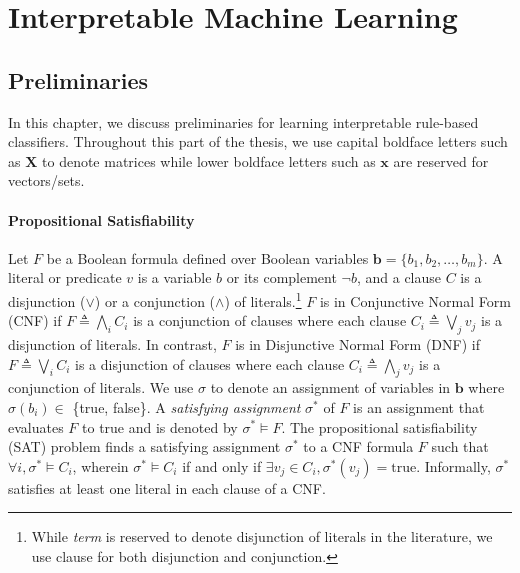 \part{Interpretable Machine Learning}

\chapter{Preliminaries}


In this chapter, we discuss preliminaries for learning interpretable rule-based classifiers. Throughout this part of the thesis, we use capital  boldface letters such as $\mathbf{X}$ to denote matrices while lower boldface letters such as $\mathbf{x}$ are reserved for vectors/sets. 

\subsection*{Propositional Satisfiability}

Let $F$ be a Boolean formula defined over Boolean variables $\mathbf{b} = \{b_1,b_2,\dots ,b_m \}$. A literal or predicate $ v $ is a variable $b$ or its complement $\neg b$, and a clause $ C $ is a disjunction ($ \vee $) or a conjunction ($ \wedge $) of literals.\footnote{While \emph{term} is reserved to denote disjunction of literals in the literature, we use clause for both disjunction and conjunction.}  $F$ is in Conjunctive Normal Form (CNF) if $F \triangleq  \bigwedge_i C_i$ is a conjunction of clauses where each clause $C_i \triangleq  \bigvee_j v_j $  is a disjunction of literals. In contrast, $ F $ is in Disjunctive Normal Form (DNF) if $F \triangleq  \bigvee_i C_i$ is a disjunction of clauses where each clause $C_i \triangleq  \bigwedge_j v_j $ is a conjunction of literals. We use $\sigma$ to denote an assignment of variables in  $\mathbf{b}$ where $ \sigma(b_i) \in $ \{true, false\}. A \emph{satisfying assignment} $ \sigma^* $ of $F$ is an assignment  that evaluates $F$  to true and is denoted by $ \sigma^* \models F $. The propositional satisfiability (SAT) problem finds a satisfying assignment $ \sigma^* $ to a CNF formula $ F $  such that $ \forall i, \sigma^* \models C_i $, wherein $ \sigma^*\models C_i $ if and only if $ \exists v_j \in C_i, \sigma^*(v_j) = \text{true} $. Informally, $ \sigma^* $ satisfies at least one literal in each clause of a CNF. 


